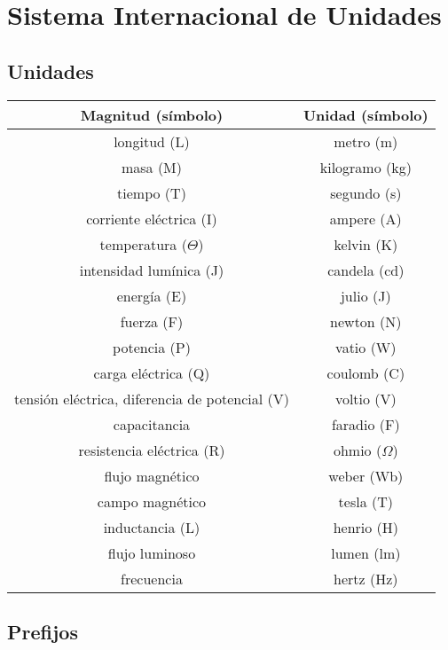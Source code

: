\section{Sistema Internacional de Unidades}
\subsection{Unidades}

\begin{tabular}{|c|c|}
\hline 
Magnitud (símbolo) & Unidad (símbolo) \\ 
\hline 
longitud (L) & metro (m) \\ 
\hline 
masa (M) & kilogramo (kg) \\ 
\hline 
tiempo (T) & segundo (s) \\ 
\hline 
corriente eléctrica (I) & ampere (A) \\ 
\hline 
temperatura ($ \Theta $) & kelvin (K) \\ 
\hline 
intensidad lumínica (J) & candela (cd) \\ 
\hline 
energía (E) & julio (J) \\ 
\hline 
fuerza (F) & newton (N) \\ 
\hline 
potencia (P) & vatio (W) \\ 
\hline 
carga eléctrica (Q) & coulomb (C) \\ 
\hline 
tensión eléctrica, diferencia de potencial (V) & voltio (V) \\ 
\hline 
capacitancia & faradio (F) \\ 
\hline 
resistencia eléctrica (R) & ohmio ($ \Omega $) \\ 
\hline 
flujo magnético & weber (Wb) \\ 
\hline 
campo magnético & tesla (T) \\ 
\hline 
inductancia (L) & henrio (H) \\ 
\hline 
flujo luminoso & lumen (lm) \\ 
\hline
frecuencia & hertz (Hz) \\ 
\hline
\end{tabular} 

\subsection{Prefijos}\label{section:prefijos}

